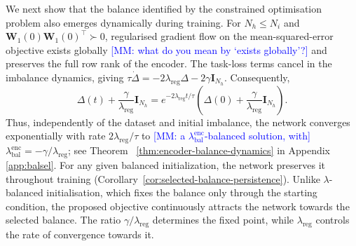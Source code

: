 \documentclass{article} %
\newcommand{\wa}{\mathbf{W}_1}
\theoremstyle{remark}
\newcommand{\mm}[1]{\textcolor{blue}{[MM: #1]}}
\begin{document}
 We next show that the balance
identified by the constrained optimisation problem also emerges
dynamically during training. For $N_h\leq N_i$ and
$\wa(0)\wa(0)^\top\succ0$, regularised gradient flow on the
mean-squared-error objective exists globally \mm{what do you mean by `exists globally'?} and preserves the
full row rank of the encoder. The task-loss terms cancel in the imbalance dynamics,
giving $\tau\dot{\Delta}
=
-2\lambda_{\mathrm{reg}}\Delta-2\gamma\mathbf{I}_{N_h}.$
Consequently,
$$\Delta(t)+\frac{\gamma}{\lambda_{\mathrm{reg}}}\mathbf{I}_{N_h}
=
e^{-2\lambda_{\mathrm{reg}}t/\tau}
\left(
\Delta(0)+\frac{\gamma}{\lambda_{\mathrm{reg}}}\mathbf{I}_{N_h}
\right).$$
Thus, independently of the dataset and initial imbalance, the network
converges exponentially with rate $2\lambda_{\mathrm{reg}}/\tau$ to \mm{a $\lambda_{\mathrm{bal}}^{\mathrm{enc}}$-balanced solution, with}
$\lambda_{\mathrm{bal}}^{\mathrm{enc}}
=-\gamma/\lambda_{\mathrm{reg}}$; see
Theorem ~\ref{thm:encoder-balance-dynamics} in Appendix \ref{app:balsel}.
For any  given balanced initialization, the network preserves it throughout training (Corollary~\ref{cor:selected-balance-persistence}). Unlike $\lambda$-balanced initialisation, which fixes the balance only
through the starting condition, the proposed objective continuously
attracts the network towards the selected balance. The ratio
$\gamma/\lambda_{\mathrm{reg}}$ determines the fixed point, while
$\lambda_{\mathrm{reg}}$ controls the rate of convergence towards it. 
%
\end{document}
